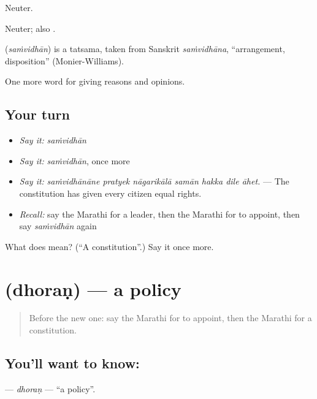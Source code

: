 Neuter.

Neuter; also .

\begin{cousinweb}
\textbf{} (\emph{saṁvidhān}) is a tatsama, taken from Sanskrit \emph{saṁvidhāna}, \textquotedblleft{}arrangement, disposition\textquotedblright{} (Monier-Williams).
\end{cousinweb}

\begin{grammarlens}[title={What you've built}]
One more word for giving reasons and opinions.
\end{grammarlens}

\subsection*{Your turn}
\begin{itemize}
\raggedright
  \item \emph{Say it:} \emph{saṁvidhān}
  \item \emph{Say it:} \emph{saṁvidhān}, once more
  \item \emph{Say it:} \emph{saṁvidhānāne pratyek nāgarikālā samān hakka dile āhet.} — The constitution has given every citizen equal rights.
  \item \emph{Recall:} say the Marathi for a leader, then the Marathi for to appoint, then say \emph{saṁvidhān} again
\end{itemize}

\begin{tcolorbox}[breakable,colback=teal!4,colframe=teal!35!black,title={Before you move on}]
What does  mean? (\textquotedblleft{}A constitution\textquotedblright{}.) Say it once more.
\end{tcolorbox}
\section[\texorpdfstring{\mr{धोरण} (dhoraṇ)}{धोरण (dhoraṇ)}]{ (dhoraṇ) — a policy}

\label{lesson:MR-C358-dhoran}



\begin{quote}
Before the new one: say the Marathi for to appoint, then the Marathi for a constitution.
\end{quote}

\subsection*{You'll want to know: }
\textbf{} — \emph{dhoraṇ} — \textquotedblleft{}a policy\textquotedblright{}.

